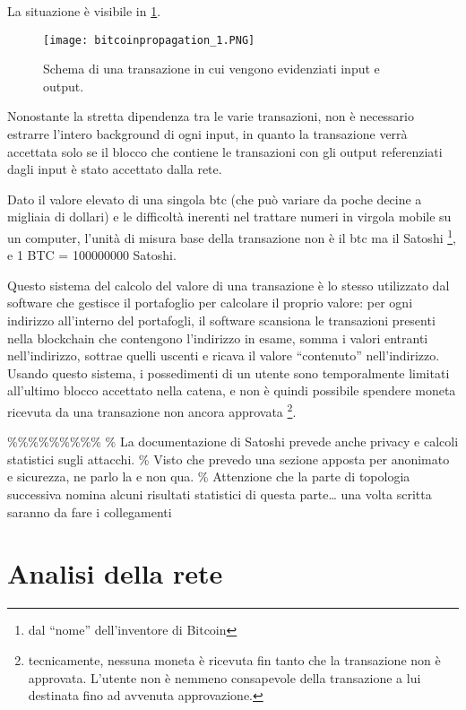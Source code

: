 La situazione è visibile in \ref{bitcoinpropagation_1}.

\begin{figure}[htbp]
\centering
\texttt{[image: bitcoinpropagation\_1.PNG]}
\caption{Schema di una transazione in cui vengono evidenziati input e output.\label{bitcoinpropagation_1}}
\end{figure}

Nonostante la stretta dipendenza tra le varie transazioni, non è necessario estrarre l'intero background di ogni input, in quanto la transazione verrà accettata solo se il blocco che contiene le transazioni con gli output referenziati dagli input è stato accettato dalla rete.

Dato il valore elevato di una singola btc (che può variare da poche decine a migliaia di dollari) e le difficoltà inerenti nel trattare numeri in virgola mobile su un computer, l'unità di misura base della transazione non è il btc ma il Satoshi \footnote{dal ``nome''   dell'inventore di Bitcoin}, e 1 BTC = 100000000 Satoshi.

Questo sistema del calcolo del valore di una transazione è lo stesso utilizzato dal software che gestisce il portafoglio per calcolare il proprio valore: per ogni indirizzo all'interno del portafogli, il software scansiona le transazioni presenti nella blockchain che contengono l'indirizzo in esame, somma i valori entranti nell'indirizzo, sottrae quelli uscenti e ricava il valore ``contenuto'' nell'indirizzo. Usando questo sistema, i possedimenti di un utente sono temporalmente limitati all'ultimo blocco accettato nella catena, e non è quindi possibile spendere moneta ricevuta da una transazione non ancora approvata \footnote{tecnicamente, nessuna moneta è ricevuta fin tanto   che la transazione non è approvata. L'utente non è nemmeno consapevole   della transazione a lui destinata fino ad avvenuta approvazione.}.

\%\%\%\%\%\%\%\%\% \% La documentazione di Satoshi prevede anche privacy e calcoli statistici sugli attacchi. \% Visto che prevedo una sezione apposta per anonimato e sicurezza, ne parlo la e non qua. \% Attenzione che la parte di topologia successiva nomina alcuni risultati statistici di questa parte\ldots{} una volta scritta saranno da fare i collegamenti

\section{Analisi della rete}\label{analisi-della-rete}


